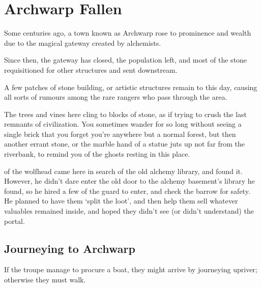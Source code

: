 
\section{Archwarp Fallen}
\label{lostcity}

\begin{multicols}{2}

\begin{exampletext}
  Some centuries ago, a town known as Archwarp rose to prominence and wealth due to the magical gateway created by alchemists.

  Since then, the gateway has closed, the population left, and most of the stone requisitioned for other structures and sent downstream.

  A few patches of stone building, or artistic structures remain to this day, causing all sorts of rumours among the rare rangers who pass through the area.
\end{exampletext}

\begin{boxtext}
  The trees and vines here cling to blocks of stone, as if trying to crush the last remnants of civilization.
  You sometimes wander for so long without seeing a single brick that you forget you're anywhere but a normal forest, but then another errant stone, or the marble hand of a statue juts up not far from the riverbank, to remind you of the ghosts resting in this place.
\end{boxtext}

\begin{exampletext}
  \noindent
   of the \gls{wolfhead} came here in search of the old alchemy library, and found it.
  However, he didn't dare enter the old door to the alchemy basement's library he found, so he hired a few of the \gls{guard} to enter, and check the barrow for safety.
  He planned to have them `split the loot', and then help them sell whatever valuables remained inside, and hoped they didn't see (or didn't understand) the portal.
\end{exampletext}

\subsection{Journeying to Archwarp}
If the troupe manage to procure a boat, they might arrive by journeying upriver; otherwise they must walk.


\end{multicols}
